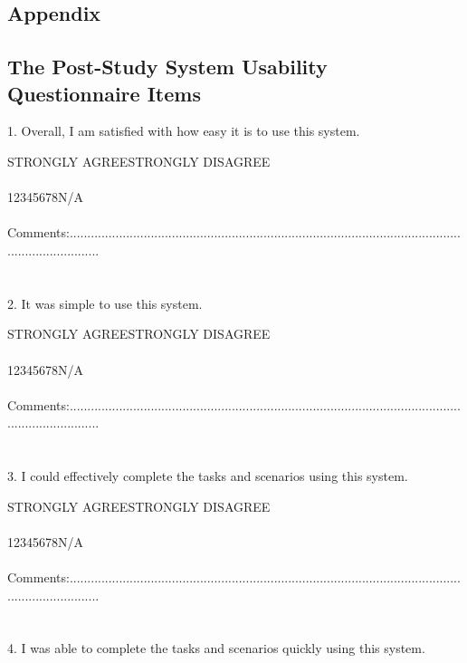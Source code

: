\newpage
\newcommand{\tab}{\hspace*{4em}}
\begin{appendix}
\section{Appendix}
\subsection{The Post-Study System Usability Questionnaire Items}
{\parindent0pt

1. Overall, I am satisfied with how easy it is to use this system.

STRONGLY AGREE\tab\tab\tab\tab\tab STRONGLY DISAGREE\\
\\
\tab1\tab2\tab3\tab4\tab5\tab6\tab7\tab8\tab\tab N/A\\
\\
Comments:.........................................................................................................................................\\
\\
\\
2. It was simple to use this system.

STRONGLY AGREE\tab\tab\tab\tab\tab STRONGLY DISAGREE\\
\\
\tab1\tab2\tab3\tab4\tab5\tab6\tab7\tab8\tab\tab N/A\\
\\
Comments:.........................................................................................................................................\\
\\
\\
3. I could effectively complete the tasks and scenarios using this system.

STRONGLY AGREE\tab\tab\tab\tab\tab STRONGLY DISAGREE\\
\\
\tab1\tab2\tab3\tab4\tab5\tab6\tab7\tab8\tab\tab N/A\\
\\
Comments:.........................................................................................................................................\\
\\
\\
4. I was able to complete the tasks and scenarios quickly using this system.

}
\end{appendix}
